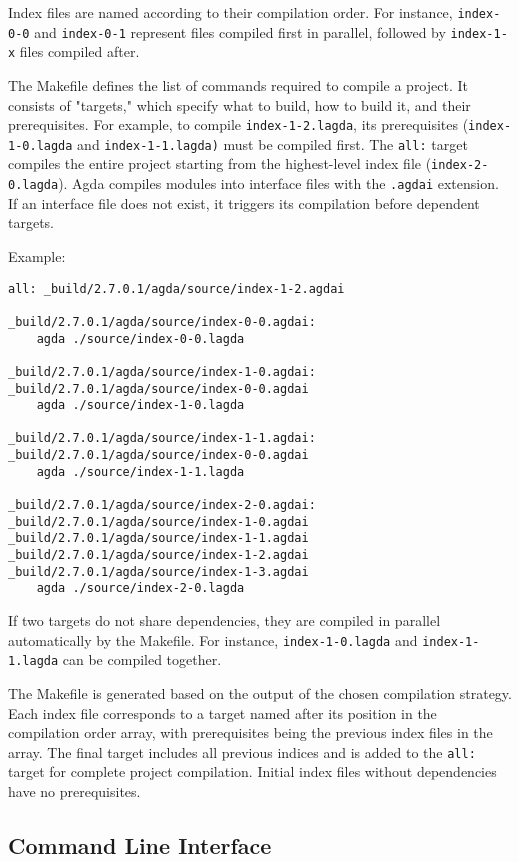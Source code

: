 Index files are named according to their compilation order. For instance,
\texttt{index-0-0} and \texttt{index-0-1} represent files compiled first in parallel, followed by
\texttt{index-1-x} files compiled after. 

The Makefile defines the list of commands required to compile a project. It
consists of "targets," which specify what to build, how to build it, and their
prerequisites. For example, to compile \texttt{index-1-2.lagda}, its
prerequisites (\texttt{index-1-0.lagda} and \texttt{index-1-1.lagda)} must be
compiled first. The \texttt{all:} target compiles the entire project starting
from the highest-level index file (\texttt{index-2-0.lagda}). Agda compiles
modules into interface files with the \texttt{.agdai} extension. If an
interface file does not exist, it triggers its compilation
before dependent targets.

Example:

\begin{lstlisting}
all: _build/2.7.0.1/agda/source/index-1-2.agdai 

_build/2.7.0.1/agda/source/index-0-0.agdai: 
	agda ./source/index-0-0.lagda

_build/2.7.0.1/agda/source/index-1-0.agdai: _build/2.7.0.1/agda/source/index-0-0.agdai 
	agda ./source/index-1-0.lagda

_build/2.7.0.1/agda/source/index-1-1.agdai: _build/2.7.0.1/agda/source/index-0-0.agdai 
	agda ./source/index-1-1.lagda

_build/2.7.0.1/agda/source/index-2-0.agdai: _build/2.7.0.1/agda/source/index-1-0.agdai _build/2.7.0.1/agda/source/index-1-1.agdai _build/2.7.0.1/agda/source/index-1-2.agdai _build/2.7.0.1/agda/source/index-1-3.agdai 
	agda ./source/index-2-0.lagda
\end{lstlisting}

If two targets do not share dependencies, they are compiled in parallel
automatically by the Makefile. For instance, \texttt{index-1-0.lagda}
and \texttt{index-1-1.lagda} can be compiled together.

The Makefile is generated based on the output of the chosen compilation
strategy. Each index file corresponds to a target named after its position in
the compilation order array, with prerequisites being the previous index
files in the array. The final target includes all previous indices and is added
to the \texttt{all:} target for complete project compilation. Initial index files
without dependencies have no prerequisites.

\subsection{Command Line Interface}


